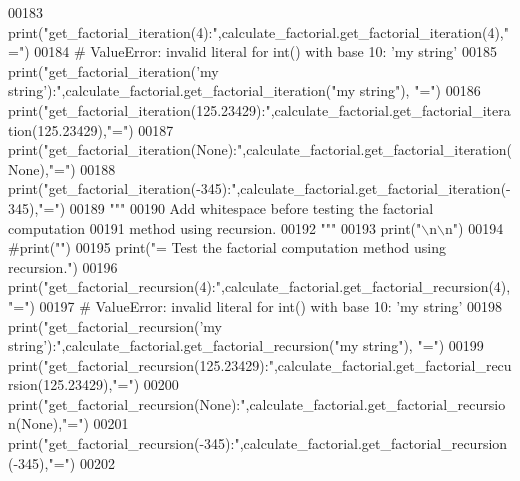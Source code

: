\begin{DoxyCode}
00183     print(\textcolor{stringliteral}{"get\_factorial\_iteration(4):"},calculate\_factorial.get\_factorial\_iteration(4),\textcolor{stringliteral}{"="})
00184     \textcolor{comment}{# ValueError: invalid literal for int() with base 10: 'my string'}
00185     print(\textcolor{stringliteral}{"get\_factorial\_iteration('my string'):"},calculate\_factorial.get\_factorial\_iteration(\textcolor{stringliteral}{"my string"}),\textcolor{stringliteral}{
      "="})
00186     print(\textcolor{stringliteral}{"get\_factorial\_iteration(125.23429):"},calculate\_factorial.get\_factorial\_iteration(125.23429),\textcolor{stringliteral}{"="})
00187     print(\textcolor{stringliteral}{"get\_factorial\_iteration(None):"},calculate\_factorial.get\_factorial\_iteration(\textcolor{keywordtype}{None}),\textcolor{stringliteral}{"="})
00188     print(\textcolor{stringliteral}{"get\_factorial\_iteration(-345):"},calculate\_factorial.get\_factorial\_iteration(-345),\textcolor{stringliteral}{"="})
00189     \textcolor{stringliteral}{"""}
00190 \textcolor{stringliteral}{        Add whitespace before testing the factorial computation}
00191 \textcolor{stringliteral}{            method using recursion.}
00192 \textcolor{stringliteral}{    """}
00193     print(\textcolor{stringliteral}{"\(\backslash\)n\(\backslash\)n"})
00194     \textcolor{comment}{#print("")}
00195     print(\textcolor{stringliteral}{"=    Test the factorial computation method using recursion."})
00196     print(\textcolor{stringliteral}{"get\_factorial\_recursion(4):"},calculate\_factorial.get\_factorial\_recursion(4),\textcolor{stringliteral}{"="})
00197     \textcolor{comment}{# ValueError: invalid literal for int() with base 10: 'my string'}
00198     print(\textcolor{stringliteral}{"get\_factorial\_recursion('my string'):"},calculate\_factorial.get\_factorial\_recursion(\textcolor{stringliteral}{"my string"}),\textcolor{stringliteral}{
      "="})
00199     print(\textcolor{stringliteral}{"get\_factorial\_recursion(125.23429):"},calculate\_factorial.get\_factorial\_recursion(125.23429),\textcolor{stringliteral}{"="})
00200     print(\textcolor{stringliteral}{"get\_factorial\_recursion(None):"},calculate\_factorial.get\_factorial\_recursion(\textcolor{keywordtype}{None}),\textcolor{stringliteral}{"="})
00201     print(\textcolor{stringliteral}{"get\_factorial\_recursion(-345):"},calculate\_factorial.get\_factorial\_recursion(-345),\textcolor{stringliteral}{"="})
00202     
\end{DoxyCode}
